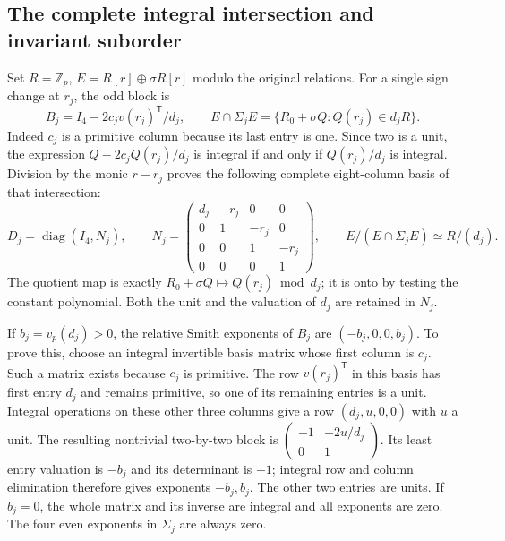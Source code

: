 \documentclass[11pt]{article}
\begin{document}
\subsection{The complete integral intersection and invariant suborder}
Set $R=\mathbb Z_p$, $E=R[r]\oplus\sigma R[r]$ modulo the original
relations. For a single sign change at $r_j$, the odd block is
\[
 B_j=I_4-2c_jv(r_j)^{\mathsf T}/d_j,
 \qquad
 E\cap\Sigma_jE
 =\{R_0+\sigma Q:Q(r_j)\in d_jR\}.
 \tag{SGR2}
\]
Indeed $c_j$ is a primitive column because its last entry is one.
Since two is a unit, the expression
$Q-2c_jQ(r_j)/d_j$ is integral if and only if $Q(r_j)/d_j$ is
integral. Division by the monic $r-r_j$ proves the following complete
eight-column basis of that intersection:
\[
 D_j=\operatorname{diag}(I_4,N_j),\qquad
 N_j=\begin{pmatrix}
 d_j&-r_j&0&0\\0&1&-r_j&0\\0&0&1&-r_j\\0&0&0&1
 \end{pmatrix},\qquad
 E/(E\cap\Sigma_jE)\simeq R/(d_j).
 \tag{SGR3}
\]
The quotient map is exactly $R_0+\sigma Q\mapsto Q(r_j)\bmod d_j$;
it is onto by testing the constant polynomial. Both the unit and the
valuation of $d_j$ are retained in $N_j$.

If $b_j=v_p(d_j)>0$, the relative Smith exponents of $B_j$ are
$(-b_j,0,0,b_j)$. To prove this, choose an integral invertible basis
matrix whose first column is $c_j$. Such a matrix exists because
$c_j$ is primitive. The row $v(r_j)^{\mathsf T}$ in this basis has
first entry $d_j$ and remains primitive, so one of its remaining
entries is a unit. Integral operations on these other three columns
give a row $(d_j,u,0,0)$ with $u$ a unit. The resulting nontrivial
two-by-two block is
$\left(\begin{smallmatrix}-1&-2u/d_j\\0&1\end{smallmatrix}\right)$.
Its least entry valuation is $-b_j$ and its determinant is $-1$;
integral row and column elimination therefore gives exponents
$-b_j,b_j$. The other two entries are units. If $b_j=0$, the whole
matrix and its inverse are integral and all exponents are zero.
The four even exponents in $\Sigma_j$ are always zero.
\end{document}
